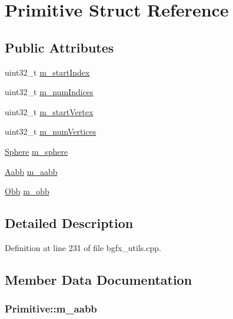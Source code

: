 \hypertarget{struct_primitive}{\section{Primitive Struct Reference}
\label{struct_primitive}
}
\subsection*{Public Attributes}
\begin{DoxyCompactItemize}
\item 
uint32\+\_\+t \hyperlink{struct_primitive_a524dcc6919c7db516cf2cc3966c822a9}{m\+\_\+start\+Index}
\item 
uint32\+\_\+t \hyperlink{struct_primitive_a9e3e819abe78ce0985035f05f7da7188}{m\+\_\+num\+Indices}
\item 
uint32\+\_\+t \hyperlink{struct_primitive_a7b688e027923f1db6199297091f18ac1}{m\+\_\+start\+Vertex}
\item 
uint32\+\_\+t \hyperlink{struct_primitive_ad3f80b4cf1ff628aaf15d8d3fcb72eb8}{m\+\_\+num\+Vertices}
\item 
\hyperlink{struct_sphere}{Sphere} \hyperlink{struct_primitive_ab10e85804e536da2653fa59c25fe5a31}{m\+\_\+sphere}
\item 
\hyperlink{struct_aabb}{Aabb} \hyperlink{struct_primitive_a52135ed0211ed7fb80104c6377ab2cf8}{m\+\_\+aabb}
\item 
\hyperlink{struct_obb}{Obb} \hyperlink{struct_primitive_ab3b2dc953998acdb9e644c98790ba9d9}{m\+\_\+obb}
\end{DoxyCompactItemize}


\subsection{Detailed Description}


Definition at line 231 of file bgfx\+\_\+utils.\+cpp.



\subsection{Member Data Documentation}
\hypertarget{struct_primitive_a52135ed0211ed7fb80104c6377ab2cf8}{
\subsubsection[{m\+\_\+aabb}]{ Primitive\+::m\+\_\+aabb}}\label{struct_primitive_a52135ed0211ed7fb80104c6377ab2cf8}


